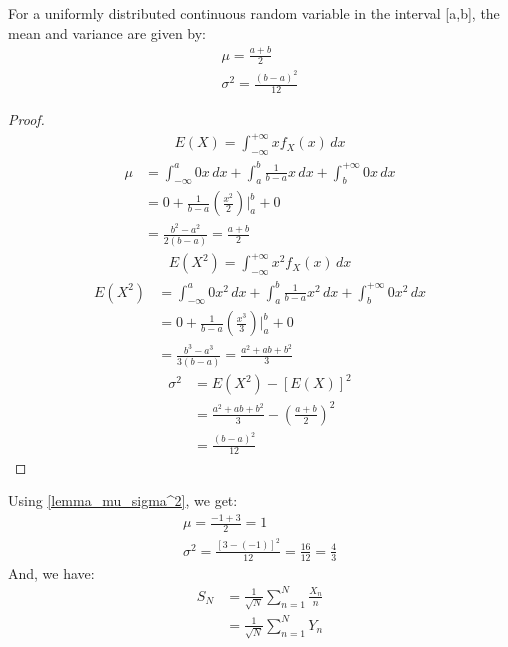 \documentclass[journal,12pt,twocolumn]{IEEEtran}
\begin{document}
\begin{lemma} \label{lemma_mu_sigma^2}
For a uniformly distributed continuous random variable in the interval [a,b], the mean and variance are given by:
\begin{align}
    \mu = \frac{a+b}{2}\\
    \sigma^2 = \frac{(b-a)^2}{12}
\end{align}
\end{lemma}
\begin{proof}
\begin{align}
       E(X) = \int_{-\infty}^{+\infty} xf_X(x) \,dx
\end{align}
\begin{align}      
     \mu &= \int_{-\infty}^{a} 0 x \,dx + \int_{a}^{b} \frac{1}{b-a} x \,dx + \int_{b}^{+\infty} 0 x \,dx\\
     &= 0 + \frac{1}{b-a} \left(\frac{x^2}{2}\right)\Bigr|_{a}^{b} + 0 \\
     &= \frac{b^2 - a^2}{2(b - a)} = \frac{a+b}{2}
\end{align}
\begin{align}      
       E(X^2) = \int_{-\infty}^{+\infty} x^2f_X(x) \,dx
\end{align}
\begin{align}      
     E(X^2) &= \int_{-\infty}^{a} 0 x^2 \,dx + \int_{a}^{b} \frac{1}{b-a} x^2 \,dx + \int_{b}^{+\infty} 0 x^2 \,dx\\
     &= 0 + \frac{1}{b-a} \left(\frac{x^3}{3}\right)\Bigr|_{a}^{b} + 0 \\
     &= \frac{b^3 - a^3}{3(b - a)} = \frac{a^2 + ab + b^2}{3}
\end{align}   
\begin{align}
       \sigma^2 &= E(X^2) - [E(X)]^2 \\
       &= \frac{a^2 + ab + b^2}{3} - \left(\frac{a+b}{2}\right)^2\\
       &= \frac{(b-a)^2}{12}
\end{align}

\end{proof}
Using \eqref{lemma_mu_sigma^2}, we get:
\begin{align}
    \mu = \frac{-1 + 3}{2} = 1\\
    \sigma^2 = \frac{[3 - (-1)]^2}{12} = \frac{16}{12} = \frac{4}{3}
\end{align}
And, we have:
\begin{align}
  S_N &= \frac{1}{\sqrt{N}} \sum_{n=1}^N \frac{X_n}{n} \\
      &= \frac{1}{\sqrt{N}} \sum_{n=1}^N Y_n
\end{align}
\end{document}
